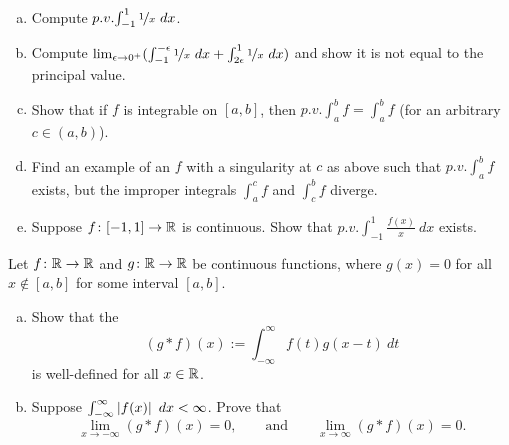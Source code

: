 \begin{samepage}
\begin{exercise}
{\ }
\begin{enumerate}[a)]
\item
Compute $p.v.\!\int_{-1}^1 \nicefrac{1}{x}~dx$.
\item
Compute
$\lim_{\epsilon\to 0^+}
( \int_{-1}^{-\epsilon} \nicefrac{1}{x}~dx + 
\int_{2\epsilon}^1 \nicefrac{1}{x}~dx )$ and show it is not equal
to the principal value.
\item
Show that if $f$ is integrable on $[a,b]$, then
$p.v.\!\int_a^b f = \int_a^b f$ (for an arbitrary $c \in (a,b)$).
\item
Find an example of an $f$ with a singularity at $c$ as above
such that 
$p.v.\!\int_a^b f$ exists, but the improper integrals
$\int_a^c f$ and $\int_c^b f$ diverge.
\item
Suppose 
$f \colon [-1,1] \to {\mathbb{R}}$ is continuous.  Show that
$p.v.\!\int_{-1}^1 \frac{f(x)}{x}~dx$ exists.
\end{enumerate}
\end{exercise}
\end{samepage}

\begin{exercise}
Let $f \colon {\mathbb{R}} \to {\mathbb{R}}$ and 
$g \colon {\mathbb{R}} \to {\mathbb{R}}$ be continuous functions, where
$g(x) = 0$ for all $x \notin [a,b]$ for some interval $[a,b]$.
\begin{enumerate}[a)]
\item
Show that the
\emph{}
\begin{equation*}
(g * f)(x) := \int_{-\infty}^\infty f(t)g(x-t)~dt 
\end{equation*}
is well-defined for all $x \in {\mathbb{R}}$.
\item
Suppose $\int_{-\infty}^\infty \left\lvert {f(x)} \right\rvert~dx < \infty$.  Prove that
\begin{equation*}
\lim_{x \to -\infty} (g * f)(x) = 0, \qquad \text{and} \qquad
\lim_{x \to \infty} (g * f)(x) = 0 .
\end{equation*}
\end{enumerate}
\end{exercise}
